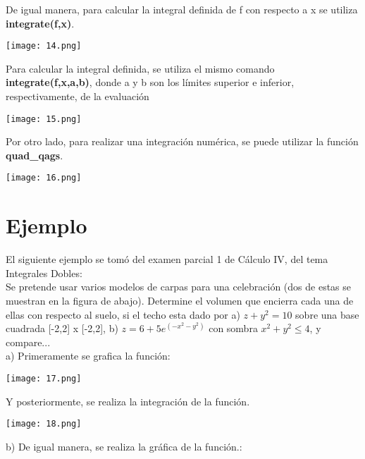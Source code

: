 \documentclass[12pt]{article}
\begin{document}
De igual manera, para calcular la integral definida de f con respecto a x se utiliza \textbf{integrate(f,x)}.\\

\begin{center}
 \texttt{[image: 14.png]}
 \end{center}

Para calcular la integral definida, se utiliza el mismo comando \textbf{integrate(f,x,a,b)}, donde a y b son los límites superior e inferior, respectivamente, de la evaluación\\

\begin{center}
 \texttt{[image: 15.png]}
 \end{center}

Por otro lado, para realizar una integración numérica, se puede utilizar la función \textbf{quad\_qags}. \\

\begin{center}
 \texttt{[image: 16.png]}
 \end{center}


\section{Ejemplo}

El siguiente ejemplo se tomó del examen parcial 1 de Cálculo IV, del tema Integrales Dobles:\\

Se pretende usar varios modelos de carpas para una celebración (dos de estas se muestran en la figura de abajo). Determine el volumen que encierra cada una de ellas con respecto al suelo, si el techo esta dado por a) $z+y^2=10$ sobre una base cuadrada [-2,2] x [-2,2], b)  $z=6+5e^(-x^2-y^2)$ con sombra $x^2+y^2 \leq 4$, y compare...\\

a) Primeramente se grafica la función: 

\begin{center}
 \texttt{[image: 17.png]}
 \end{center}
 
 Y posteriormente, se realiza la integración de la función.
 
 \begin{center}
 \texttt{[image: 18.png]}
 \end{center}
 
 b) De igual manera, se realiza la gráfica de la función.: 
 
\end{document}
